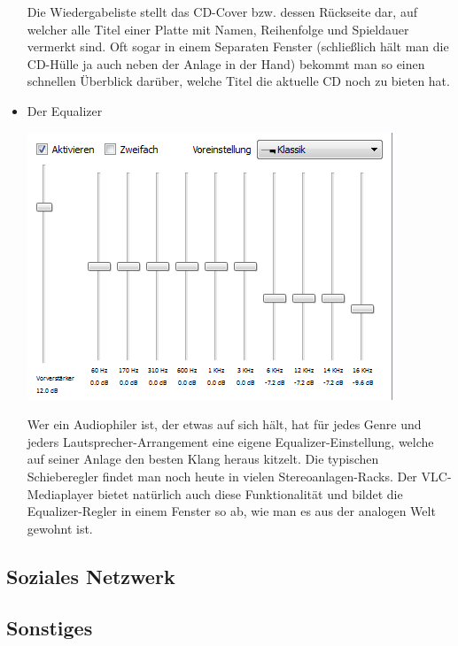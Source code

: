 \documentclass[a4paper,10pt]{article}
\begin{document}
\begin{itemize}
Die Wiedergabeliste stellt das CD-Cover bzw. dessen Rückseite dar, auf welcher alle Titel einer Platte mit Namen, Reihenfolge und Spieldauer vermerkt sind. Oft sogar in einem Separaten Fenster (schließlich hält man die CD-Hülle ja auch neben der Anlage in der Hand) bekommt man so einen schnellen Überblick darüber, welche Titel die aktuelle CD noch zu bieten hat.

\item Der Equalizer

\includegraphics[scale=1]{eq.png}

Wer ein Audiophiler ist, der etwas auf sich hält, hat für jedes Genre und jeders Lautsprecher-Arrangement eine eigene Equalizer-Einstellung, welche auf seiner Anlage den besten Klang heraus kitzelt. Die typischen Schieberegler findet man noch heute in vielen Stereoanlagen-Racks. Der VLC-Mediaplayer bietet natürlich auch diese Funktionalität und bildet die Equalizer-Regler in einem Fenster so ab, wie man es aus der analogen Welt gewohnt ist.
\end{itemize}
\subsection{Soziales Netzwerk}

\subsection{Sonstiges}
\end{document}

